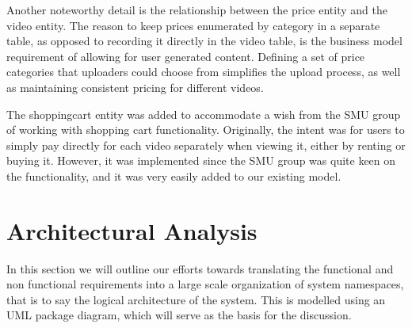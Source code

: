 Another noteworthy detail is the relationship between the price entity and the video entity. The reason to keep prices enumerated by category in a separate table, as opposed to recording it directly in the video table, is the business model requirement of allowing for user generated content. Defining a set of price categories that uploaders could choose from simplifies the upload process, as well as maintaining consistent pricing for different videos.

The shoppingcart entity was added to accommodate a wish from the SMU group of working with shopping cart functionality. Originally, the intent was for users to simply pay directly for each video separately when viewing it, either by renting or buying it. However, it was implemented since the SMU group was quite keen on the functionality, and it was very easily added to our existing model.

\section{Architectural Analysis}
In this section we will outline our efforts towards translating the functional and non functional requirements into a large scale organization of system namespaces, that is to say the logical architecture of the system. This is modelled using an UML package diagram, which will serve as the basis for the discussion.
